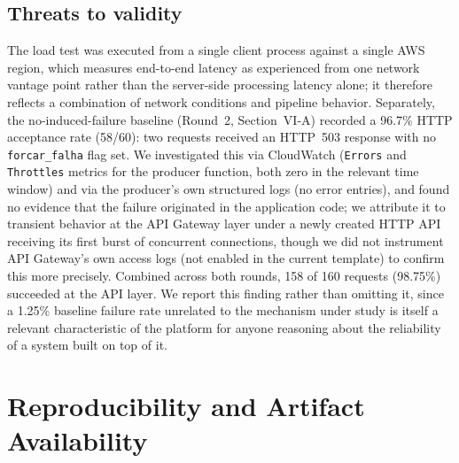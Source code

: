 \documentclass[conference]{IEEEtran}
\begin{document}
\subsection{Threats to validity}
\label{sec:threats}
The load test was executed from a single client process against a single AWS region, which measures end-to-end latency as experienced from one network vantage point rather than the server-side processing latency alone; it therefore reflects a combination of network conditions and pipeline behavior. Separately, the no-induced-failure baseline (Round~2, Section~VI-A) recorded a 96.7\% HTTP acceptance rate (58/60): two requests received an HTTP~503 response with no \texttt{forcar\_falha} flag set. We investigated this via CloudWatch (\texttt{Errors} and \texttt{Throttles} metrics for the producer function, both zero in the relevant time window) and via the producer's own structured logs (no error entries), and found no evidence that the failure originated in the application code; we attribute it to transient behavior at the API Gateway layer under a newly created HTTP API receiving its first burst of concurrent connections, though we did not instrument API Gateway's own access logs (not enabled in the current template) to confirm this more precisely. Combined across both rounds, 158 of 160 requests (98.75\%) succeeded at the API layer. We report this finding rather than omitting it, since a 1.25\% baseline failure rate unrelated to the mechanism under study is itself a relevant characteristic of the platform for anyone reasoning about the reliability of a system built on top of it.

\section{Reproducibility and Artifact Availability}
\end{document}
